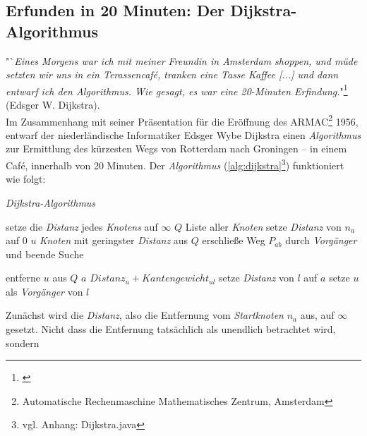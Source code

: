 \documentclass[12pt]{article}
\begin{document}
\subsection{Erfunden in 20 Minuten: Der Dijkstra-Algorithmus}
\label{sec:dijk}
"`{\em Eines Morgens war ich mit meiner Freundin in Amsterdam shoppen, und müde setzten wir uns in ein Terassencafé, tranken eine Tasse Kaffee [...] und dann entwarf ich den Algorithmus. Wie gesagt, es war eine 20-Minuten Erfindung.}"\footnote{\cite[(engl.), S. 42f]{interview}} (Edsger W. Dijkstra).
\\
Im Zusammenhang mit seiner Präsentation für die Eröffnung des ARMAC\footnote{Automatische Rechenmaschine Mathematisches Zentrum, Amsterdam} 1956, entwarf der niederländische Informatiker Edsger Wybe Dijkstra einen \textit{Algorithmus} zur Ermittlung des kürzesten Wegs von Rotterdam nach Groningen -- in einem Café, innerhalb von 20 Minuten. 
Der \textit{Algorithmus} (\autoref{alg:dijkstra}\footnote{vgl. Anhang: Dijkstra.java}) funktioniert wie folgt:
\begin{algorithm}
\caption{\textit{Dijkstra-Algorithmus} \label{alg:dijkstra}}
\begin{algorithmic}[1]
\Statex
{}
\Statex
{}
	\State setze die \textit{Distanz} jedes  \textit{Knotens} auf $\infty$
	\State \sei $Q$ Liste aller \textit{Knoten}
	\State setze \textit{Distanz} von $n_a$ auf $0$
		\State \sei $u$ \textit{Knoten} mit geringster \textit{Distanz} aus $Q$
			\State erschließe Weg $P_{ab}$ durch \textit{Vorgänger} und beende Suche
		\EndIf		
		
		\State entferne $u$ aus $Q$
			\State \sei $a$ $Distanz_u + Kantengewicht_{ul}$
				\State setze \textit{Distanz} von $l$ auf $a$
				\State setze $u$ als \textit{Vorgänger} von $l$
			\EndIf
		\EndFor
	\EndWhile
\EndProcedure
\end{algorithmic}
\end{algorithm}
\newpage
\noindent Zunächst wird die \textit{Distanz}, also die Entfernung vom \textit{Startknoten} $n_a$ aus, auf $\infty$ gesetzt. Nicht dass die Entfernung tatsächlich als unendlich betrachtet wird, sondern 
\end{document}
